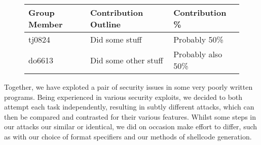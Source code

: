 \begin{figure}[h]
\centering
\begin{tabular}{|l|l|l|}
\hline
{\bf Group Member} & {\bf Contribution Outline} & {\bf Contribution \%} \\
\hline
tj0824 & Did some stuff & Probably 50\% \\
do6613 & Did some other stuff & Probably also 50\% \\
\hline
\end{tabular}
\end{figure}

Together, we have exploted a pair of security issues in some very poorly written programs. Being experienced in various
security exploits, we decided to both attempt each task independently, resulting in subtly different attacks, which can
then be compared and contrasted for their various features. Whilst some steps in our attacks our similar or identical,
we did on occasion make effort to differ, such as with our choice of format specifiers and our methods of
shellcode generation.

